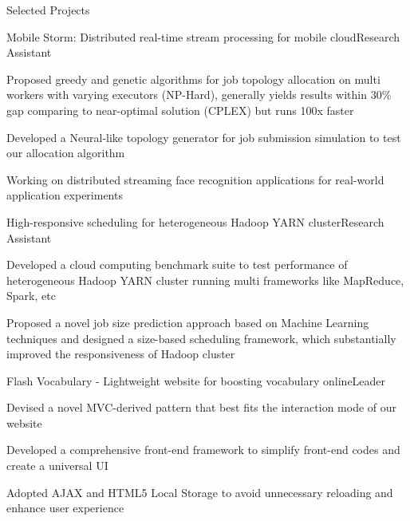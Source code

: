 \documentclass{resume} %
\begin{document}
\begin{rSection}{Selected Projects}
\begin{rSubsection}{Mobile Storm: Distributed real-time stream processing for mobile cloud}{Research Assistant}{}{}
\item Proposed greedy and genetic algorithms for job topology allocation on multi workers with varying executors (NP-Hard), generally yields results within $30\%$ gap comparing to near-optimal solution (CPLEX) but runs 100x faster
\item Developed a Neural-like topology generator for job submission simulation to test our allocation algorithm
\item Working on distributed streaming face recognition applications for real-world application experiments

\end{rSubsection}

\begin{rSubsection}{High-responsive scheduling for heterogeneous Hadoop YARN cluster}{Research Assistant}{}{}
\item Developed a cloud computing benchmark suite to test performance of heterogeneous Hadoop YARN cluster running multi frameworks like MapReduce, Spark, etc
\item Proposed a novel job size prediction approach based on Machine Learning techniques and designed a size-based scheduling framework, which substantially improved the responsiveness of Hadoop cluster

\end{rSubsection}





\begin{rSubsection}{Flash Vocabulary - Lightweight website for boosting vocabulary online}{Leader}{}{}
\item Devised a novel MVC-derived pattern that best fits the interaction mode of our website
\item Developed a comprehensive front-end framework to simplify front-end codes and create a universal UI
\item Adopted AJAX and HTML5 Local Storage to avoid unnecessary reloading and enhance user experience
\end{rSubsection}


\end{rSection}
\end{document}
